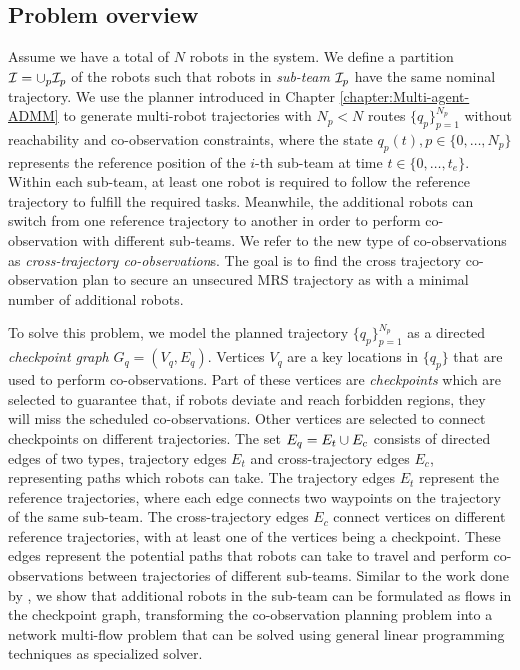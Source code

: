 \documentclass[journal]{IEEEtran}  %
\begin{document}
\subsection{Problem overview}

Assume we have a total of $N$ robots in the system. We define a partition $\mathcal{I}=\cup_p \mathcal{I}_p$ of the robots such that robots in \emph{sub-team} $\mathcal{I}_p$ have the same nominal trajectory. We use the planner introduced in Chapter \ref{chapter:Multi-agent-ADMM} to generate multi-robot trajectories with $N_{p}<N$ routes $\{q_p\}_{p=1}^{N_p}$ without reachability and co-observation constraints, where the state $q_p(t), p \in\{0,\ldots,N_{p}\}$ represents the reference position of the $i$-th sub-team at time $t\in\{0, \dots, t_{e}\}$. Within each sub-team, at least one robot is required to follow the reference trajectory to fulfill the required tasks. Meanwhile, the additional robots can switch from one reference trajectory to another in order to perform co-observation with different sub-teams. We refer to the new type of co-observations as \emph{cross-trajectory co-observation}s. The goal is to find the cross trajectory co-observation plan to secure an unsecured MRS trajectory as with a minimal number of additional robots.

To solve this problem, we model the planned trajectory $\{q_p\}_{p=1}^{N_p}$ as a directed \emph{checkpoint graph} $G_{q}=(V_{q}, E_{q})$. Vertices $V_{q}$ are a key locations in $\{q_p\}$ that are used to perform co-observations. Part of these vertices are \emph{checkpoints} which are selected to guarantee that, if robots deviate and reach forbidden regions, they will miss the scheduled co-observations. Other vertices are selected to connect checkpoints on different trajectories. The set $E_{q} = E_{t} \cup E_{c}$ consists of directed edges of two types, trajectory edges $E_{t}$ and cross-trajectory edges $E_{c}$, representing paths which robots can take. The trajectory edges $E_{t}$ represent the reference trajectories, where each edge connects two waypoints on the trajectory of the same sub-team. The cross-trajectory edges $E_{c}$ connect vertices on different reference trajectories, with at least one of the vertices being a checkpoint. These edges represent the potential paths that robots can take to travel and perform co-observations between trajectories of different sub-teams. Similar to the work done by \cite{yu2013multi}, we show that additional robots in the sub-team can be formulated as flows in the checkpoint graph, transforming the co-observation planning problem into a network multi-flow problem that can be solved using general linear programming techniques as specialized solver. 
\end{document}
